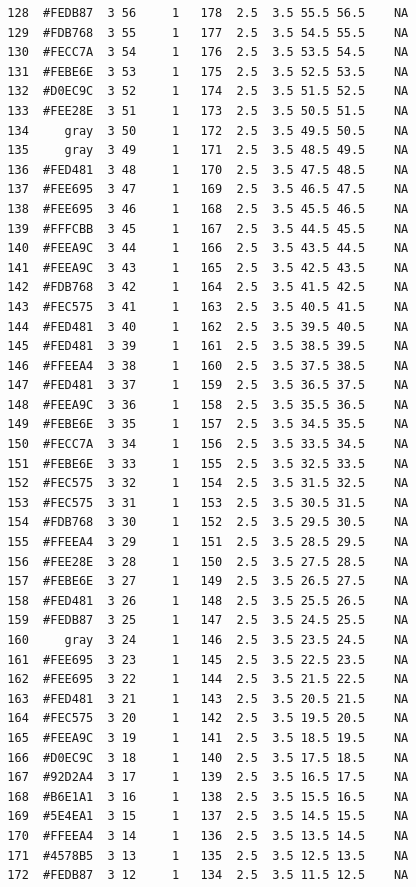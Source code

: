 \documentclass[12pt,twoside]{reedthesis}
\begin{document}
\begin{verbatim}
  128  #FEDB87  3 56     1   178  2.5  3.5 55.5 56.5    NA
  129  #FDB768  3 55     1   177  2.5  3.5 54.5 55.5    NA
  130  #FECC7A  3 54     1   176  2.5  3.5 53.5 54.5    NA
  131  #FEBE6E  3 53     1   175  2.5  3.5 52.5 53.5    NA
  132  #D0EC9C  3 52     1   174  2.5  3.5 51.5 52.5    NA
  133  #FEE28E  3 51     1   173  2.5  3.5 50.5 51.5    NA
  134     gray  3 50     1   172  2.5  3.5 49.5 50.5    NA
  135     gray  3 49     1   171  2.5  3.5 48.5 49.5    NA
  136  #FED481  3 48     1   170  2.5  3.5 47.5 48.5    NA
  137  #FEE695  3 47     1   169  2.5  3.5 46.5 47.5    NA
  138  #FEE695  3 46     1   168  2.5  3.5 45.5 46.5    NA
  139  #FFFCBB  3 45     1   167  2.5  3.5 44.5 45.5    NA
  140  #FEEA9C  3 44     1   166  2.5  3.5 43.5 44.5    NA
  141  #FEEA9C  3 43     1   165  2.5  3.5 42.5 43.5    NA
  142  #FDB768  3 42     1   164  2.5  3.5 41.5 42.5    NA
  143  #FEC575  3 41     1   163  2.5  3.5 40.5 41.5    NA
  144  #FED481  3 40     1   162  2.5  3.5 39.5 40.5    NA
  145  #FED481  3 39     1   161  2.5  3.5 38.5 39.5    NA
  146  #FFEEA4  3 38     1   160  2.5  3.5 37.5 38.5    NA
  147  #FED481  3 37     1   159  2.5  3.5 36.5 37.5    NA
  148  #FEEA9C  3 36     1   158  2.5  3.5 35.5 36.5    NA
  149  #FEBE6E  3 35     1   157  2.5  3.5 34.5 35.5    NA
  150  #FECC7A  3 34     1   156  2.5  3.5 33.5 34.5    NA
  151  #FEBE6E  3 33     1   155  2.5  3.5 32.5 33.5    NA
  152  #FEC575  3 32     1   154  2.5  3.5 31.5 32.5    NA
  153  #FEC575  3 31     1   153  2.5  3.5 30.5 31.5    NA
  154  #FDB768  3 30     1   152  2.5  3.5 29.5 30.5    NA
  155  #FFEEA4  3 29     1   151  2.5  3.5 28.5 29.5    NA
  156  #FEE28E  3 28     1   150  2.5  3.5 27.5 28.5    NA
  157  #FEBE6E  3 27     1   149  2.5  3.5 26.5 27.5    NA
  158  #FED481  3 26     1   148  2.5  3.5 25.5 26.5    NA
  159  #FEDB87  3 25     1   147  2.5  3.5 24.5 25.5    NA
  160     gray  3 24     1   146  2.5  3.5 23.5 24.5    NA
  161  #FEE695  3 23     1   145  2.5  3.5 22.5 23.5    NA
  162  #FEE695  3 22     1   144  2.5  3.5 21.5 22.5    NA
  163  #FED481  3 21     1   143  2.5  3.5 20.5 21.5    NA
  164  #FEC575  3 20     1   142  2.5  3.5 19.5 20.5    NA
  165  #FEEA9C  3 19     1   141  2.5  3.5 18.5 19.5    NA
  166  #D0EC9C  3 18     1   140  2.5  3.5 17.5 18.5    NA
  167  #92D2A4  3 17     1   139  2.5  3.5 16.5 17.5    NA
  168  #B6E1A1  3 16     1   138  2.5  3.5 15.5 16.5    NA
  169  #5E4EA1  3 15     1   137  2.5  3.5 14.5 15.5    NA
  170  #FFEEA4  3 14     1   136  2.5  3.5 13.5 14.5    NA
  171  #4578B5  3 13     1   135  2.5  3.5 12.5 13.5    NA
  172  #FEDB87  3 12     1   134  2.5  3.5 11.5 12.5    NA

\end{verbatim}
\end{document}
